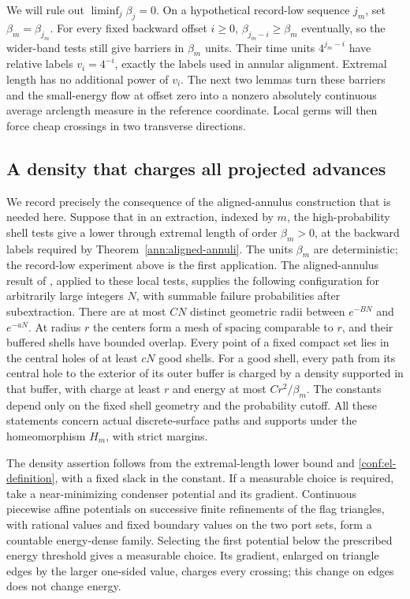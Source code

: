 \documentclass[11pt]{article}
\numberwithin{equation}{section}
\theoremstyle{definition}
\theoremstyle{remark}
\newcommand{\1}{\mathbf 1}
\begin{document}
We will rule out \(\liminf_j\beta_j=0\).  On a hypothetical
record-low sequence \(j_m\), set \(\beta_m=\beta_{j_m}\).
For every fixed backward offset \(i\ge0\),
\(\beta_{j_m-i}\ge\beta_m\) eventually, so the wider-band tests
still give barriers in \(\beta_m\) units.  Their time units
\(4^{j_m-i}\) have relative labels \(v_i=4^{-i}\), exactly the
labels used in annular alignment.  Extremal length has no additional
power of \(v_i\).  The next two lemmas turn these barriers and the
small-energy flow at offset zero into a nonzero absolutely continuous
average arclength measure in the reference coordinate.  Local germs
will then force cheap crossings in two transverse directions.

\subsection{A density that charges all projected advances}
\label{conf:density-subsection}

We record precisely the consequence of the aligned-annulus construction
that is needed here.  Suppose that in an extraction, indexed by \(m\),
the high-probability shell tests give a lower through extremal length
of order \(\beta_m>0\), at the backward labels required by
Theorem~\ref{ann:aligned-annuli}.  The units \(\beta_m\) are
deterministic; the record-low experiment above is the first application.
The aligned-annulus result of , applied to
these local tests, supplies the following configuration for arbitrarily
large integers \(N\), with summable failure probabilities after
subextraction.  There are at most \(C N\) distinct geometric radii
between \(e^{-BN}\) and \(e^{-aN}\).  At radius \(r\) the centers
form a mesh of spacing comparable to \(r\), and their buffered shells
have bounded overlap.  Every point of a fixed compact set lies in the
central holes of at least \(cN\) good shells.  For a good shell, every
path from its central hole to the exterior of its outer buffer is
charged by a density supported in that buffer, with charge at least
\(r\) and energy at most \(Cr^2/\beta_m\).  The constants depend
only on the fixed shell geometry and the probability cutoff.  All these
statements concern actual discrete-surface paths and supports under
the homeomorphism \(H_m\), with strict margins.

The density assertion follows from the extremal-length lower bound and
\eqref{conf:el-definition}, with a fixed slack in the constant.  If a
measurable choice is required, take a near-minimizing condenser
potential and its gradient.  Continuous piecewise affine potentials
on successive finite refinements of the flag triangles, with rational
values and fixed boundary values on the two port sets, form a
countable energy-dense family.  Selecting the first potential below
the prescribed energy threshold gives a measurable choice.  Its
gradient, enlarged on triangle edges by the larger one-sided value,
charges every crossing; this change on edges does not change energy.
\end{document}
